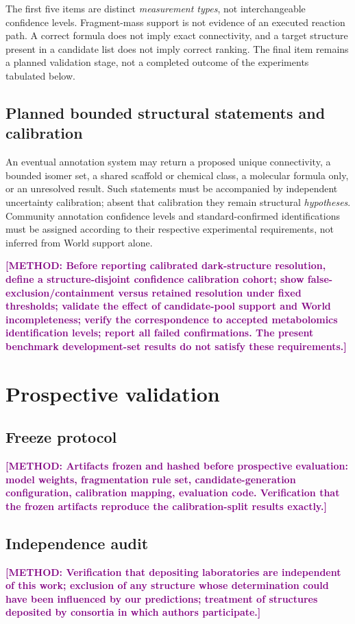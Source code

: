 \documentclass[12pt]{article}
\newcommand{\methodtodo}[1]{\textbf{\textcolor{purple}{[METHOD: #1]}}}
\begin{document}
The first five items are distinct \emph{measurement types}, not interchangeable confidence levels. Fragment-mass support is not evidence of an executed reaction path. A correct formula does not imply exact connectivity, and a target structure present in a candidate list does not imply correct ranking. The final item remains a planned validation stage, not a completed outcome of the experiments tabulated below.

\subsection{Planned bounded structural statements and calibration}
An eventual annotation system may return a proposed unique connectivity, a bounded isomer set, a shared scaffold or chemical class, a molecular formula only, or an unresolved result. Such statements must be accompanied by independent uncertainty calibration; absent that calibration they remain structural \emph{hypotheses}. Community annotation confidence levels and standard-confirmed identifications must be assigned according to their respective experimental requirements, not inferred from World support alone.

\methodtodo{Before reporting calibrated dark-structure resolution, define a structure-disjoint confidence calibration cohort; show false-exclusion/containment versus retained resolution under fixed thresholds; validate the effect of candidate-pool support and World incompleteness; verify the correspondence to accepted metabolomics identification levels; report all failed confirmations. The present benchmark development-set results do not satisfy these requirements.}

\section{Prospective validation}

\subsection{Freeze protocol}
\methodtodo{Artifacts frozen and hashed before prospective evaluation: model weights, fragmentation rule set, candidate-generation configuration, calibration mapping, evaluation code. Verification that the frozen artifacts reproduce the calibration-split results exactly.}

\subsection{Independence audit}
\methodtodo{Verification that depositing laboratories are independent of this work; exclusion of any structure whose determination could have been influenced by our predictions; treatment of structures deposited by consortia in which authors participate.}
\end{document}
